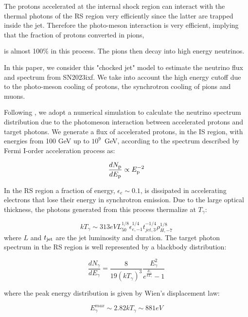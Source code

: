 \documentclass[twocolumn]{aastex631}
\begin{document}
The protons accelerated at the internal shock region can interact with the thermal photons of the RS region very efficiently since the latter are trapped inside the jet. Therefore the photo-meson interaction is very efficient, implying that the fraction of protons converted in pions, {is almost 100$\%$ in this process. The pions then decay into high energy neutrinos. 

In this paper, we consider this "chocked jet" model \citep{Senno2016,He2018,Fasano2021} to estimate the neutrino flux and spectrum  from SN2023ixf. We take into account the high energy cutoff due to the photo-meson cooling of protons, the synchrotron cooling of pions and muons.

Following \citep{He2018,Fasano2021}, we adopt a numerical simulation to calculate the neutrino spectrum distribution due to the photomeson interaction between accelerated protons and target photons. We generate a flux of accelerated protons, in the IS region, with energies from 100 GeV up to $10^{9}$~GeV, according to the spectrum described by Fermi I-order acceleration process as:

\begin{equation}
    \frac{dN_{\rm p}}{dE_{\rm p}} \propto E_{\rm p}^{-2}
\end{equation}

In the RS region a fraction of energy, $\epsilon_e\sim0.1$, is dissipated in accelerating electrons that lose their energy in synchrotron emission. Due to the large optical thickness, the photons generated from this process thermalize at $T_{\gamma}$:

\begin{equation}
    k T_{\gamma} \sim 313 eV L_{50}^{1/8} \epsilon_{e,-1}^{1/4} t_{jet,3}^{-1/4} \rho_{H,-7}^{1/8}
\end{equation}
where $L$ and $t_{\rm jet}$ are the jet luminosity and duration.
The target photon spectrum  in the RS region is well represented by a blackbody distribution:

\begin{equation}
    \frac{dN_{\gamma}}{dE_{\gamma}}= \frac{8}{19(k T_{\gamma})^3} \frac{E_{\gamma}^2}{e^{\frac{E_\gamma}{k T_\gamma}}-1}
\end{equation}

where the peak energy distribution is given by Wien's displacement law:

\begin{equation}
    E_{\gamma}^{max} \sim 2.82 k T_{\gamma} \sim 881 eV
\end{equation}

}
\end{document}
